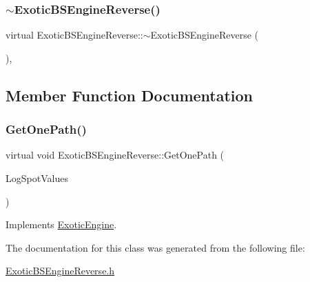 \subsubsection{\texorpdfstring{$\sim$\+Exotic\+B\+S\+Engine\+Reverse()}{~ExoticBSEngineReverse()}}
{\footnotesize\ttfamily virtual Exotic\+B\+S\+Engine\+Reverse\+::$\sim$\+Exotic\+B\+S\+Engine\+Reverse (\begin{DoxyParamCaption}{ }\end{DoxyParamCaption})\hspace{0.3cm}{\ttfamily [inline]}, {\ttfamily [virtual]}}



\subsection{Member Function Documentation}
\hypertarget{classExoticBSEngineReverse_ad60a172cfb94070d61b07c4140949b74}{}\label{classExoticBSEngineReverse_ad60a172cfb94070d61b07c4140949b74} 
\subsubsection{\texorpdfstring{Get\+One\+Path()}{GetOnePath()}}
{\footnotesize\ttfamily virtual void Exotic\+B\+S\+Engine\+Reverse\+::\+Get\+One\+Path (\begin{DoxyParamCaption}\item[{\hyperlink{classMJArray}{M\+J\+Array} \&}]{Log\+Spot\+Values }\end{DoxyParamCaption})\hspace{0.3cm}{\ttfamily [virtual]}}



Implements \hyperlink{classExoticEngine_a1be567d24e89abadb95bb2af7224b54e}{Exotic\+Engine}.



The documentation for this class was generated from the following file\+:\begin{DoxyCompactItemize}
\item 
\hyperlink{ExoticBSEngineReverse_8h}{Exotic\+B\+S\+Engine\+Reverse.\+h}\end{DoxyCompactItemize}
